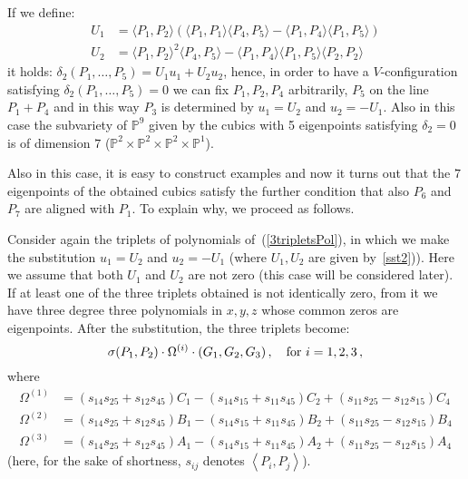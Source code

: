 \documentclass[12pt, a4paper, reqno, captions=tableheading,bibliography=totoc]{scrartcl}
\theoremstyle{plain}
\theoremstyle{definition}
\newcommand{\scl}[2]{\left\langle {#1}, {#2} \right\rangle}
\begin{document}
If we define:
\begin{equation}
  \begin{split}
    U_1 & =  \langle P_1, P_2\rangle \left(\langle P_1, P_1\rangle
  \langle P_4,P_5\rangle - \langle P_1, P_4\rangle \langle P_1, P_5\rangle
  \right)\\
  U_2 & =  \langle P_1, P_2\rangle^2\langle P_4, P_5\rangle
  -\langle P_1, P_4\rangle \langle P_1, P_5\rangle \langle P_2, P_2\rangle
  \label{sst2}
  \end{split}
\end{equation}
it holds: $\delta_2(P_1, \dots, P_5) = U_1u_1+U_2u_2$, hence, in order to
have a $V$-configuration satisfying $\delta_2(P_1, \dots, P_5) = 0$ we can
fix $P_1, P_2, P_4$ arbitrarily, $P_5$ on the line $P_1+P_4$ and in this
way $P_3$ is determined by $u_1 = U_2$ and $u_2 = -U_1$. Also in this case
the subvariety of $\mathbb{P}^9$ given by the cubics with 5
eigenpoints satisfying $\delta_2 = 0$ is of dimension $7$
($\mathbb{P}^2\times \mathbb{P}^2 \times \mathbb{P}^2\times \mathbb{P}^1$).

Also in this case, it is easy to construct examples and now it turns out that
the $7$ eigenpoints of the obtained cubics satisfy the further
condition that also $P_6$ and  $P_7$ are aligned with $P_1$. To explain
why, we proceed as follows.

Consider again the
triplets of polynomials of~(\ref{3tripletsPol}), in which we make the
substitution $u_1 = U_2$ and $u_2 = -U_1$ (where $U_1, U_2$ are
given by~\ref{sst2})). Here we
assume that both $U_1$ and $U_2$ are not zero (this case will be considered
later). If at least one of the three triplets obtained is not identically
zero, from it we have three degree three polynomials in $x, y, z$ whose
common zeros are eigenpoints.
After the substitution, the three triplets become:
%
\begin{equation}
\sigma(P_1, P_2) \cdot \Omega^{(i)} \cdot  \left(G_1, G_2, G_3\right),\quad
\hbox{for } i = 1, 2, 3 \,,
\label{G1G2G3}
\end{equation}
%
where
%
\begin{equation}
\label{3_Omega}
  \begin{split}
  \Omega^{(1)} & = (s_{14} s_{25} + s_{12} s_{45}) C_{1}
- (s_{14}s_{15}+s_{11}s_{45})C_{2} +(s_{11} s_{25}- s_{12} s_{15})C_4 \\
  \Omega^{(2)} & = (s_{14} s_{25} + s_{12} s_{45}) B_{1}
- (s_{14} s_{15} + s_{11} s_{45}) B_{2} +(s_{11} s_{25} - s_{12} s_{15}) B_{4} \\
  \Omega^{(3)} & = (s_{14} s_{25} + s_{12} s_{45}) A_{1}
- (s_{14} s_{15} +s_{11} s_{45})A_{2} +(s_{11} s_{25}-s_{12} s_{15})A_{4}
\end{split}
\end{equation}
%
(here, for the sake of shortness, $s_{ij}$ denotes $\scl{P_i}{P_j}$).
\end{document}
